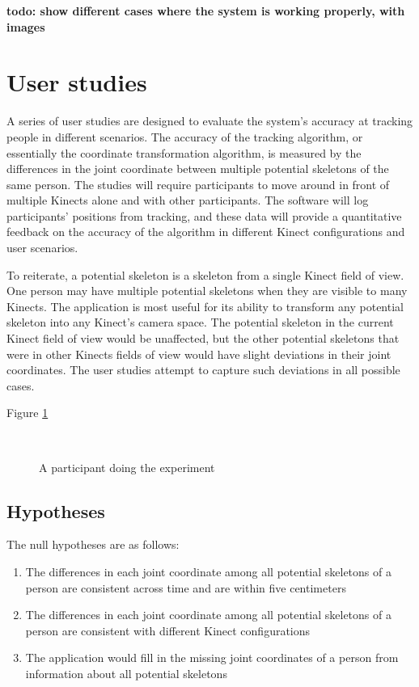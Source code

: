 \documentclass{sigchi}
\begin{document}
\textbf{todo: show different cases where the system is working properly, with images}

\section{User studies}
\label{sec:user_studies}

A series of user studies are designed to evaluate the system's accuracy at tracking people in different scenarios. The accuracy of the tracking algorithm, or essentially the coordinate transformation algorithm, is measured by the differences in the joint coordinate between multiple potential skeletons of the same person. The studies will require participants to move around in front of multiple Kinects alone and with other participants. The software will log participants' positions from tracking, and these data will provide a quantitative feedback on the accuracy of the algorithm in different Kinect configurations and user scenarios.

To reiterate, a potential skeleton is a skeleton from a single Kinect field of view. One person may have multiple potential skeletons when they are visible to many Kinects. The application is most useful for its ability to transform any potential skeleton into any Kinect's camera space. The potential skeleton in the current Kinect field of view would be unaffected, but the other potential skeletons that were in other Kinects fields of view would have slight deviations in their joint coordinates. The user studies attempt to capture such deviations in all possible cases.

Figure \ref{fig:studies_example}

\begin{figure}[!h]
  \centering
  
  \caption{A participant doing the experiment}~\label{fig:studies_example}
\end{figure}

\subsection{Hypotheses}

The null hypotheses are as follows:

\begin{enumerate}
  \item The differences in each joint coordinate among all potential skeletons of a person are consistent across time and are within five centimeters
  \item The differences in each joint coordinate among all potential skeletons of a person are consistent with different Kinect configurations
  \item The application would fill in the missing joint coordinates of a person from information about all potential skeletons
\end{enumerate}
\end{document}
